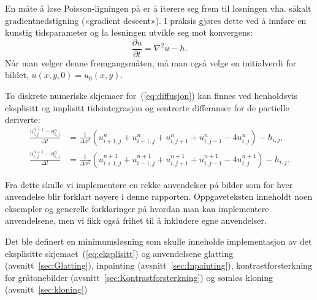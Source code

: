 En måte å løse Poisson-ligningen på er å iterere seg frem til løsningen vha. såkalt gradientnedstigning («gradient descent»). I praksis gjøres dette ved å innføre en kunstig tidsparameter og la løsningen utvikle seg mot konvergens:
\begin{equation}
\frac{\partial u}{\partial t} = \nabla^2 u - h.
\label{eq:diffusjon}
\end{equation}
Når man velger denne fremgangsmåten, må man også velge en initialverdi for bildet, $u(x, y, 0) = u_0(x, y)$.

To diskrete numeriske skjemaer for~(\ref{eq:diffusjon}) kan finnes ved henholdsvis eksplisitt og implisitt tidsintegrasjon og sentrerte differanser for de partielle deriverte:
\begin{align}
  \frac{u^{n+1}_{i,j} - u^n_{i,j}}{\Delta t} &= \frac{1}{\Delta x^2}
                                               (u^n_{i+1,j} +
                                               u^n_{i-1,j} +
                                               u^n_{i,j+1} +
                                               u^n_{i,j-1} -4 
                                               u^n_{i,j}) - h_{i,j},
                                               \label{eq:eksplisitt}  \\
  \frac{u^{n+1}_{i,j} - u^n_{i,j}}{\Delta t} &= \frac{1}{\Delta x^2}
                                               (u^{n+1}_{i+1,j} +
                                               u^{n+1}_{i-1,j} +
                                               u^{n+1}_{i,j+1} +
                                               u^{n+1}_{i,j-1} -4 
                                               u^{n+1}_{i,j}) - h_{i,j}.
                                               \label{eq:implisitt}
\end{align}

Fra dette skulle vi implementere en rekke anvendelser på bilder som for hver anvendelse blir forklart nøyere i denne rapporten. Oppgaveteksten inneholdt noen eksempler og generelle forklaringer på hvordan man kan implementere anvendelsene, men vi fikk også frihet til å inkludere egne anvendelser.

Det ble definert en minimumsløsning som skulle inneholde implementasjon av det eksplisitte skjemaet~(\ref{eq:eksplisitt}) og anvendelsene glatting (avsnitt~\ref{sec:Glatting}), inpainting (avsnitt~\ref{sec:Inpainting}), kontrastforsterkning for gråtonebilder (avsnitt~\ref{sec:Kontrastforsterkning}) og sømløs kloning (avsnitt~\ref{sec:kloning})


